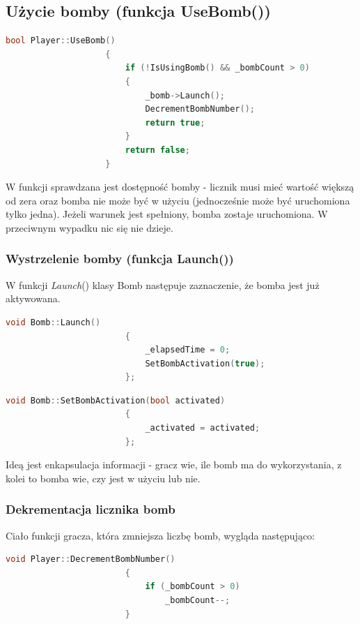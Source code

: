 \documentclass[a4paper,twoside]{article}
\begin{document}
			\subsection{Użycie bomby (funkcja UseBomb())}
				\begin{lstlisting}[language=C++]
					bool Player::UseBomb()
					{
						if (!IsUsingBomb() && _bombCount > 0)	
						{
							_bomb->Launch();
							DecrementBombNumber();
							return true;
						}
						return false;
					}
				\end{lstlisting}
				W funkcji sprawdzana jest dostępność bomby - licznik musi mieć wartość większą od zera oraz bomba nie może być w użyciu (jednocześnie może być uruchomiona tylko jedna). Jeżeli warunek jest spełniony, bomba zostaje uruchomiona. W przeciwnym wypadku nic się nie dzieje.
				\subsubsection{Wystrzelenie bomby (funkcja Launch())}
					W funkcji \textit{Launch}() klasy Bomb następuje zaznaczenie, że bomba jest już aktywowana.
					\begin{lstlisting}[language=C++]
						void Bomb::Launch()
						{
							_elapsedTime = 0;
							SetBombActivation(true);
						};
					\end{lstlisting}
					\begin{lstlisting}[language=C++]
						void Bomb::SetBombActivation(bool activated)
						{
							_activated = activated;
						};
					\end{lstlisting}
					Ideą jest enkapsulacja informacji - gracz wie, ile bomb ma do wykorzystania, z kolei to bomba wie, czy jest w użyciu lub nie.
				\subsubsection{Dekrementacja licznika bomb}
					Ciało funkcji gracza, która zmniejsza liczbę bomb, wygląda następująco:
					\begin{lstlisting}[language=C++]
						void Player::DecrementBombNumber()
						{
							if (_bombCount > 0)
								_bombCount--;
						}
					\end{lstlisting}
\end{document}
